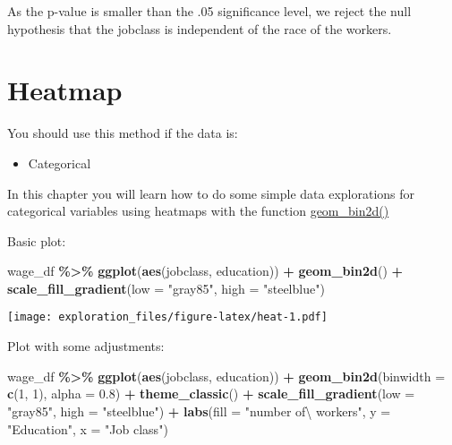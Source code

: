\documentclass[
]{book}
\newenvironment{Shaded}{\begin{snugshade}}{\end{snugshade}}
\newcommand{\DataTypeTok}[1]{\textcolor[rgb]{0.13,0.29,0.53}{#1}}
\newcommand{\DecValTok}[1]{\textcolor[rgb]{0.00,0.00,0.81}{#1}}
\newcommand{\FloatTok}[1]{\textcolor[rgb]{0.00,0.00,0.81}{#1}}
\newcommand{\KeywordTok}[1]{\textcolor[rgb]{0.13,0.29,0.53}{\textbf{#1}}}
\newcommand{\NormalTok}[1]{#1}
\newcommand{\OperatorTok}[1]{\textcolor[rgb]{0.81,0.36,0.00}{\textbf{#1}}}
\newcommand{\StringTok}[1]{\textcolor[rgb]{0.31,0.60,0.02}{#1}}
\providecommand{\tightlist}{%
  \setlength{\itemsep}{0pt}\setlength{\parskip}{0pt}}
\begin{document}
As the p-value is smaller than the .05 significance level, we reject the null hypothesis that the jobclass is independent of the race of the workers.

\hypertarget{heatmap}{%
\chapter{Heatmap}\label{heatmap}}

You should use this method if the data is:

\begin{itemize}
\tightlist
\item
  Categorical
\end{itemize}

In this chapter you will learn how to do some simple data explorations for categorical variables using heatmaps with the function \href{https://ggplot2.tidyverse.org/reference/geom_bin2d.html}{geom\_bin2d()}

Basic plot:

\begin{Shaded}
\begin{Highlighting}[]
\NormalTok{wage\_df }\OperatorTok{\%\textgreater{}\%}
\StringTok{  }\KeywordTok{ggplot}\NormalTok{(}\KeywordTok{aes}\NormalTok{(jobclass, education)) }\OperatorTok{+}
\StringTok{  }\KeywordTok{geom\_bin2d}\NormalTok{() }\OperatorTok{+}
\StringTok{  }\KeywordTok{scale\_fill\_gradient}\NormalTok{(}\DataTypeTok{low =} \StringTok{"gray85"}\NormalTok{, }\DataTypeTok{high =} \StringTok{"steelblue"}\NormalTok{) }
\end{Highlighting}
\end{Shaded}

\texttt{[image: exploration\_files/figure-latex/heat-1.pdf]}

Plot with some adjustments:

\begin{Shaded}
\begin{Highlighting}[]
\NormalTok{wage\_df }\OperatorTok{\%\textgreater{}\%}
\StringTok{  }\KeywordTok{ggplot}\NormalTok{(}\KeywordTok{aes}\NormalTok{(jobclass, education)) }\OperatorTok{+}
\StringTok{  }\KeywordTok{geom\_bin2d}\NormalTok{(}\DataTypeTok{binwidth =} \KeywordTok{c}\NormalTok{(}\DecValTok{1}\NormalTok{, }\DecValTok{1}\NormalTok{), }\DataTypeTok{alpha =} \FloatTok{0.8}\NormalTok{) }\OperatorTok{+}
\StringTok{  }\KeywordTok{theme\_classic}\NormalTok{() }\OperatorTok{+}\StringTok{ }
\StringTok{  }\KeywordTok{scale\_fill\_gradient}\NormalTok{(}\DataTypeTok{low =} \StringTok{"gray85"}\NormalTok{, }\DataTypeTok{high =} \StringTok{"steelblue"}\NormalTok{) }\OperatorTok{+}
\StringTok{  }\KeywordTok{labs}\NormalTok{(}\DataTypeTok{fill =} \StringTok{"number of\textbackslash{} workers"}\NormalTok{, }\DataTypeTok{y =} \StringTok{"Education"}\NormalTok{, }\DataTypeTok{x =} \StringTok{"Job class"}\NormalTok{)}
\end{Highlighting}
\end{Shaded}
\end{document}
